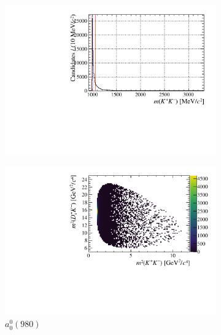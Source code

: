\begin{figure}[!ht]
    \begin{subfigure}[t]{0.32\textwidth}    
        \centering 
        \includegraphics[width=1.0\textwidth]{figs/B2DsPhi/a0_phi_mass.pdf}
    \end{subfigure}
    \begin{subfigure}[t]{0.32\textwidth}    
        \centering 
        \includegraphics[width=1.0\textwidth]{figs/B2DsPhi/a0_Dalitz_plot.pdf}
        \caption{$a_{0}^{0}(980)$}
    \end{subfigure}
    \begin{subfigure}[t]{0.32\textwidth}    
        \centering 

\end{subfigure}
\end{figure}
